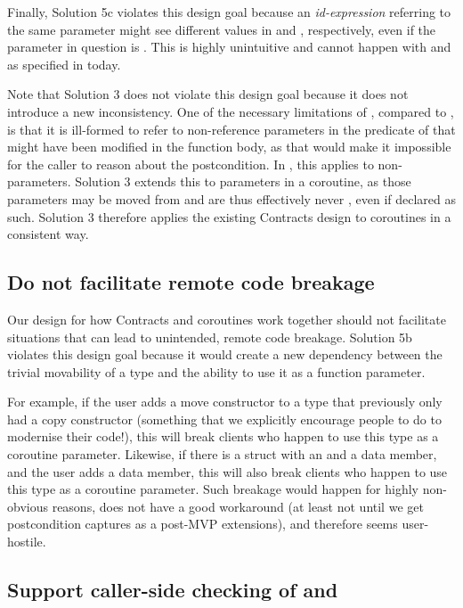 Finally, Solution 5c violates this design goal because an \emph{id-expression} referring to the same parameter might see different values in  and , respectively, even if the parameter in question is . This is highly unintuitive and cannot happen with  and  as specified in \cite{P2900R8} today.

Note that Solution 3 does not violate this design goal because it does not introduce a new inconsistency. One of the necessary limitations of , compared to , is that it is ill-formed to refer to non-reference parameters in the predicate of  that might have been modified in the function body, as that would make it impossible for the caller to reason about the postcondition. In \cite{P2900R8}, this applies to non- parameters. Solution 3 extends this to  parameters in a coroutine, as those parameters may be moved from and are thus effectively never , even if declared as such. Solution 3 therefore applies the existing Contracts design to coroutines in a consistent way.

\subsection{Do not facilitate remote code breakage}

Our design for how Contracts and coroutines work together should not facilitate situations that can lead to unintended, remote code breakage. Solution 5b violates this design goal because it would create a new dependency between the trivial movability of a type and the ability to use it as a function parameter.

For example, if the user adds a move constructor to a type that previously only had a copy constructor (something that we explicitly encourage people to do to modernise their code!), this will break clients who happen to use this type as a coroutine parameter. Likewise, if there is a struct with an  and a  data member, and the user adds a  data member, this will also break clients who happen to use this type as a coroutine parameter. Such breakage would happen for highly non-obvious reasons, does not have a good workaround (at least not until we get postcondition captures as a post-MVP extensions), and therefore seems user-hostile.

\subsection{Support caller-side checking of  and }

